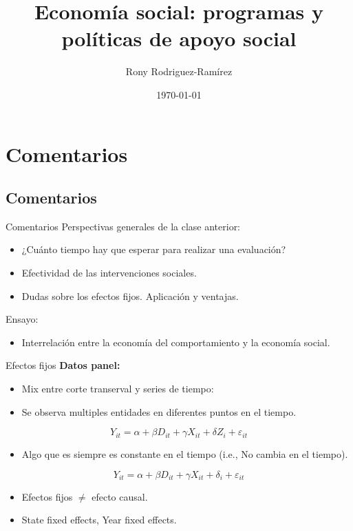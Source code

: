 \documentclass[11pt, aspectratio=169, compress]{beamer}
\title{Economía social: programas y políticas de apoyo social}
\author{Rony Rodriguez-Ramírez}
\institute{Economía Social y Humana | Grupo B018 \\Universidad Centroamericana}
\date{\today}
\begin{document}
	
\begin{frame}[plain]
	\maketitle  
\end{frame}

\section{Comentarios}
\subsection{Comentarios}
\begin{frame}[t]{Comentarios}
Perspectivas generales de la clase anterior: 
\begin{itemize}
\item ¿Cuánto tiempo hay que esperar para realizar una evaluación? 
\item Efectividad de las intervenciones sociales. 
\item Dudas sobre los efectos fijos. Aplicación y ventajas. 
\end{itemize}
Ensayo: 
\begin{itemize}
\item  Interrelación entre la economía del comportamiento y la economía social. 
\end{itemize}
\end{frame}
\begin{frame}[t]{Efectos fijos}
\textbf{Datos panel: }
\begin{itemize}
	\item Mix entre corte transerval y series de tiempo: 
	\item Se observa multiples entidades en diferentes puntos en el tiempo. 
\end{itemize}
$$ Y_{it} = \alpha + \beta D_{it} + \gamma X_{it} + \delta Z_{i} + \varepsilon_{it}$$
\vspace*{-2em}
\begin{itemize}
	\item Algo que es siempre es constante en el tiempo (i.e., No cambia en el tiempo). 
\end{itemize}
$$ Y_{it} = \alpha + \beta D_{it} + \gamma X_{it} + \delta_{i} + \varepsilon_{it}$$
\vspace*{-2em}
\begin{itemize}
	\item Efectos fijos $ \neq $ efecto causal.
	\item State fixed effects, Year fixed effects. 
\end{itemize}
\end{frame}
\end{document}
